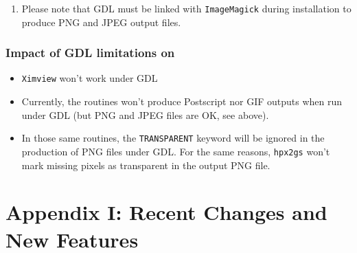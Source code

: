 \documentclass[12pt,twoside]{article}
\begin{document}
\begin{enumerate}

\item
Please note that GDL must be linked with {\tt ImageMagick} during installation to produce PNG and JPEG
output files.

\end{enumerate}

\subsubsection*{Impact of GDL limitations on \healpix}
\begin{itemize}
\item {\tt Ximview} won't work under GDL \gdlversion
\item Currently, the 
routines won't produce Postscript nor GIF outputs when run under GDL (but PNG and JPEG
files are OK, see above).
\item In those same routines, the {\tt TRANSPARENT} keyword will be ignored in the
production of PNG files under GDL. For the same reasons, {\tt hpx2gs} won't mark missing pixels as
transparent in the output PNG file.
\end{itemize}


\vfill\newpage
\section{Appendix I: Recent Changes and New Features}
\label{sec:newfeatures}
\end{document}
